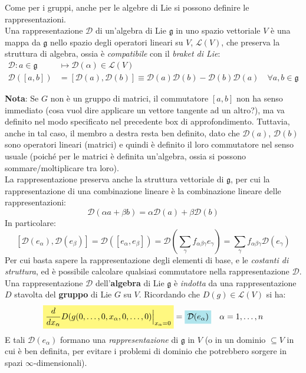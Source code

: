 \documentclass[../../FisicaTeorica.tex]{subfiles}
\begin{document}
Come per i gruppi, anche per le algebre di Lie si possono definire le rappresentazioni.\\
Una rappresentazione $\mathcal{D}$ di un'algebra di Lie $\mathfrak{g}$ in uno spazio vettoriale $V$ è una mappa da $\mathfrak{g}$ nello spazio degli operatori lineari su $V$, $\mathcal{L}(V)$, che preserva la struttura di algebra, ossia è \textit{compatibile} con il \textit{braket di Lie}:
\begin{align*}
\mathcal{D}: a \in \mathfrak{g} &\mapsto \mathcal{D}(\alpha) \in \mathcal{L}(V)\\
\mathcal{D}([a,b])&=[\mathcal{D}(a),\mathcal{D}(b)] \equiv \mathcal{D}(a)\mathcal{D}(b)-\mathcal{D}(b)\mathcal{D}(a) \quad \forall a,b\in \mathfrak{g}
\end{align*}

\textbf{Nota}: Se $G$ non è un gruppo di matrici, il commutatore $[a,b]$ non ha senso immediato (cosa vuol dire applicare un vettore tangente ad un altro?), ma va definito nel modo specificato nel precedente box di approfondimento. Tuttavia, anche in tal caso, il membro a destra resta ben definito, dato che $\mathcal{D}(a)$, $\mathcal{D}(b)$ sono operatori lineari (matrici) e quindi è definito il loro commutatore nel senso usuale (poiché per le matrici è definita un'algebra, ossia si possono sommare/moltiplicare tra loro).\\

La rappresentazione preserva anche la struttura vettoriale di $\mathfrak{g}$, per cui la rappresentazione di una combinazione lineare è la combinazione lineare delle rappresentazioni:
\[
\mathcal{D}(\alpha a + \beta b) = \alpha \mathcal{D}(a) + \beta \mathcal{D}(b)
\]
In particolare:
\[
[\mathcal{D}(e_\alpha), \mathcal{D}(e_\beta)]=\mathcal{D}([e_\alpha, e_\beta])=\mathcal{D}(\sum_\gamma f_{\alpha \beta \gamma} e_\gamma)=\sum_\gamma f_{\alpha \beta \gamma} \mathcal{D}(e_\gamma)
\]
Per cui basta sapere la rappresentazione degli elementi di base, e le \textit{costanti di struttura}, ed è possibile calcolare qualsiasi commutatore nella rappresentazione $\mathcal{D}$.\\

Una rappresentazione $\mathcal{D}$ dell'\textbf{algebra} di Lie $\mathfrak{g}$ è \textit{indotta} da una rappresentazione $D$ stavolta del \textbf{gruppo} di Lie $G$ su $V$. Ricordando che $D(g) \in \mathcal{L}(V)$ si ha:
\begin{equation}
\hlc{Yellow}{\frac{d}{dx_\alpha}D(g(0,\dots,0,x_\alpha,0,\dots, 0)\Big|_{x_\alpha=0}}= \hlc{SkyBlue}{\mathcal{D}(e_\alpha)} \quad \alpha = 1,\dots, n
\label{eqn:rappresentazioni-gruppo-algebra}
\end{equation}
E tali $\mathcal{D}(e_\alpha)$ formano una \textit{rappresentazione} di $\mathfrak{g}$ in $V$ (o in un dominio $\subseteq V$ in cui è ben definita, per evitare i problemi di dominio che potrebbero sorgere in spazi $\infty$-dimensionali).\\
\end{document}
